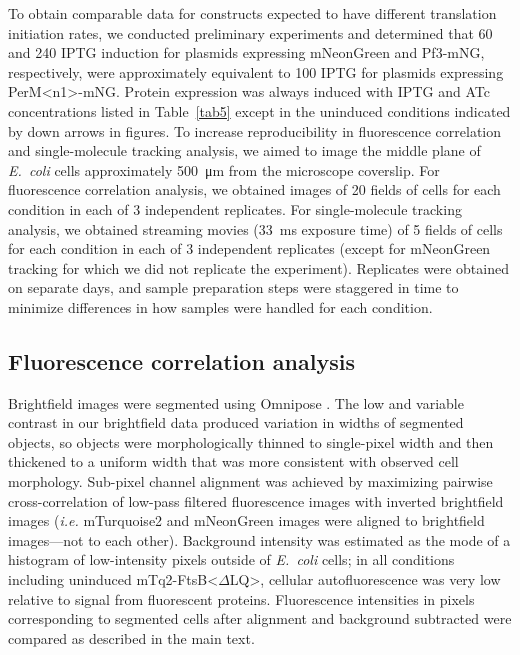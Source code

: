 \documentclass[pdflatex,sn-nature]{sn-jnl}%
\def\textsuperscript#1{<#1>}%
\newcommand\ec{\textit{E.~coli}}
\newcommand\ftsbdLQ{FtsB\textsuperscript{$\Delta{}$LQ}}
\newcommand\permN{PerM\textsuperscript{n1}}
\begin{document}
To obtain comparable data for constructs expected to have different translation initiation rates, we conducted preliminary experiments and determined that \qty{60}{\uM} and \qty{240}{\uM} IPTG induction for plasmids expressing mNeonGreen and Pf3-mNG, respectively, were approximately equivalent to \qty{100}{\uM} IPTG for plasmids expressing \permN{}-mNG.
Protein expression was always induced with IPTG and ATc concentrations listed in Table~\ref{tab5} except in the uninduced conditions indicated by down arrows in figures.
To increase reproducibility in fluorescence correlation and single-molecule tracking analysis, we aimed to image the middle plane of \ec{} cells approximately \qty{500}{\um} from the microscope coverslip.
For fluorescence correlation analysis, we obtained images of 20 fields of cells for each condition in each of 3 independent replicates.
For single-molecule tracking analysis, we obtained streaming movies (\qty{33}{\ms} exposure time) of 5 fields of cells for each condition in each of 3 independent replicates (except for mNeonGreen tracking for which we did not replicate the experiment).
Replicates were obtained on separate days, and sample preparation steps were staggered in time to minimize differences in how samples were handled for each condition.

\subsection{Fluorescence correlation analysis}

Brightfield images were segmented using Omnipose \citep{cutlerOmniposeHighprecisionMorphologyindependent2022}.
The low and variable contrast in our brightfield data produced variation in widths of segmented objects, so objects were morphologically thinned to single-pixel width and then thickened to a uniform width that was more consistent with observed cell morphology.
Sub-pixel channel alignment was achieved by maximizing pairwise cross-correlation of low-pass filtered fluorescence images with inverted brightfield images (\textit{i.e.} mTurquoise2 and mNeonGreen images were aligned to brightfield images---not to each other).
Background intensity was estimated as the mode of a histogram of low-intensity pixels outside of \ec{} cells; in all conditions including uninduced mTq2-\ftsbdLQ{}, cellular autofluorescence was very low relative to signal from fluorescent proteins.
Fluorescence intensities in pixels corresponding to segmented cells after alignment and background subtracted were compared as described in the main text.
\end{document}
